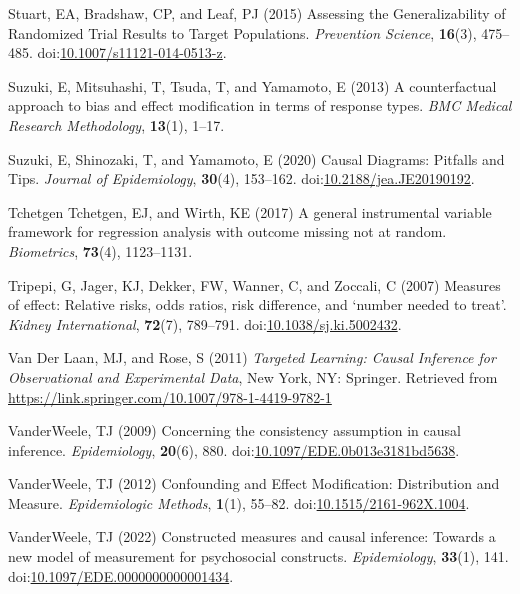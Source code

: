 \documentclass[
  single column]{article}
\newlength{\cslhangindent}
\newenvironment{CSLReferences}[2] %
 {\begin{list}{}{%
  \setlength{\itemindent}{0pt}
  \setlength{\leftmargin}{0pt}
  \setlength{\parsep}{0pt}
  \ifodd #1
   \setlength{\leftmargin}{\cslhangindent}
   \setlength{\itemindent}{-1\cslhangindent}
  \fi
  \setlength{\itemsep}{#2\baselineskip}}}
 {\end{list}}
\begin{document}
\begin{CSLReferences}{1}{0}
Stuart, EA, Bradshaw, CP, and Leaf, PJ (2015) Assessing the
Generalizability of Randomized Trial Results to Target Populations.
\emph{Prevention Science}, \textbf{16}(3), 475--485.
doi:\href{https://doi.org/10.1007/s11121-014-0513-z}{10.1007/s11121-014-0513-z}.

Suzuki, E, Mitsuhashi, T, Tsuda, T, and Yamamoto, E (2013) A
counterfactual approach to bias and effect modification in terms of
response types. \emph{BMC Medical Research Methodology}, \textbf{13}(1),
1--17.

Suzuki, E, Shinozaki, T, and Yamamoto, E (2020) Causal Diagrams:
Pitfalls and Tips. \emph{Journal of Epidemiology}, \textbf{30}(4),
153--162.
doi:\href{https://doi.org/10.2188/jea.JE20190192}{10.2188/jea.JE20190192}.

Tchetgen Tchetgen, EJ, and Wirth, KE (2017) A general instrumental
variable framework for regression analysis with outcome missing not at
random. \emph{Biometrics}, \textbf{73}(4), 1123--1131.

Tripepi, G, Jager, KJ, Dekker, FW, Wanner, C, and Zoccali, C (2007)
Measures of effect: Relative risks, odds ratios, risk difference, and
{`}number needed to treat{'}. \emph{Kidney International},
\textbf{72}(7), 789--791.
doi:\href{https://doi.org/10.1038/sj.ki.5002432}{10.1038/sj.ki.5002432}.

Van Der Laan, MJ, and Rose, S (2011) \emph{Targeted Learning: Causal
Inference for Observational and Experimental Data}, New York, NY:
Springer. Retrieved from
\url{https://link.springer.com/10.1007/978-1-4419-9782-1}

VanderWeele, TJ (2009) Concerning the consistency assumption in causal
inference. \emph{Epidemiology}, \textbf{20}(6), 880.
doi:\href{https://doi.org/10.1097/EDE.0b013e3181bd5638}{10.1097/EDE.0b013e3181bd5638}.

VanderWeele, TJ (2012) Confounding and Effect Modification: Distribution
and Measure. \emph{Epidemiologic Methods}, \textbf{1}(1), 55--82.
doi:\href{https://doi.org/10.1515/2161-962X.1004}{10.1515/2161-962X.1004}.

VanderWeele, TJ (2022) Constructed measures and causal inference:
Towards a new model of measurement for psychosocial constructs.
\emph{Epidemiology}, \textbf{33}(1), 141.
doi:\href{https://doi.org/10.1097/EDE.0000000000001434}{10.1097/EDE.0000000000001434}.


\end{CSLReferences}
\end{document}
